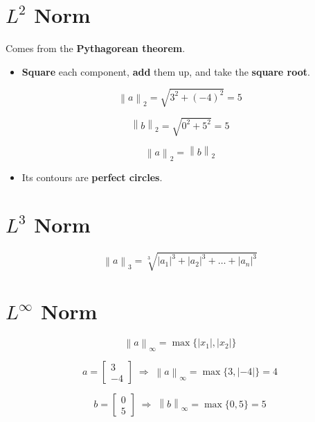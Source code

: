 \documentclass[11pt,a4paper]{article}
\newcommand{\norm}[1]{\left\lVert #1 \right\rVert}
\begin{document}
\section{$L^2$ Norm}

\begin{callout}
Comes from the \textbf{Pythagorean theorem}.
\end{callout}

\begin{itemize}
  \item \textbf{Square} each component, \textbf{add} them up, and take the \textbf{square root}.
\end{itemize}

\[
  \norm{a}_2 = \sqrt{3^2 + (-4)^2} = 5
\]

\[
  \norm{b}_2 = \sqrt{0^2 + 5^2} = 5
\]

\[
  \norm{a}_2 = \norm{b}_2
\]

\begin{itemize}
  \item Its contours are \textbf{perfect circles}.
\end{itemize}

\section{$L^3$ Norm}

\[
  \norm{a}_3 = \sqrt[3]{|a_1|^3 + |a_2|^3 + \dots + |a_n|^3}
\]

\section{$L^\infty$ Norm}

\[
  \norm{a}_\infty = \max\{|x_1|, |x_2|\}
\]

\[
  a = \begin{bmatrix} 3 \\ -4 \end{bmatrix} \;\Rightarrow\;
  \norm{a}_\infty = \max\{3, |{-4}|\} = 4
\]

\[
  b = \begin{bmatrix} 0 \\ 5 \end{bmatrix} \;\Rightarrow\;
  \norm{b}_\infty = \max\{0, 5\} = 5
\]

\end{document}
